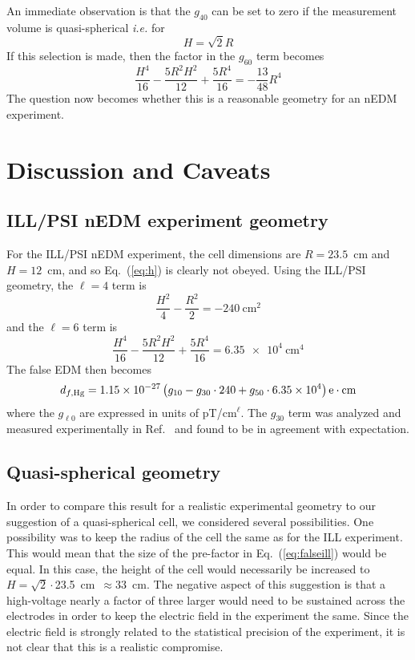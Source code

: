 \documentclass[preprint,12pt]{elsarticle}
\begin{document}
An immediate observation is that the $g_{40}$ can be set to zero if
the measurement volume is quasi-spherical {\it i.e.} for
\begin{equation}
\label{eq:h}
H=\sqrt{2}R
\end{equation}
If this selection is made, then the factor in the $g_{60}$ term becomes
\begin{equation}
\frac{H^{4}}{16}-\frac{5R^2H^2}{12}+\frac{5R^4}{16}=-\frac{13}{48}R^4
\end{equation}
The question now becomes whether this is a reasonable geometry for an
nEDM experiment.

\section{Discussion and Caveats}

\subsection{ILL/PSI nEDM experiment geometry}

For the ILL/PSI nEDM experiment, the cell dimensions are $R=23.5$~cm
and $H=12$~cm, and so Eq.~(\ref{eq:h}) is clearly not obeyed.  Using
the ILL/PSI geometry, the $\ell=4$ term is
\begin{equation}
\frac{H^{2}}{4}-\frac{R^2}{2}=-240~\mathrm{cm}^2
\end{equation}
and the $\ell=6$ term is
\begin{equation}
\frac{H^{4}}{16}-\frac{5R^2H^2}{12}+\frac{5R^4}{16}=\num{6.35e4}~\mathrm{cm}^4
\end{equation}
The false EDM then becomes
\begin{equation}
\label{eq:falseill}
d_{f,\rm Hg} = \num{1.15e-27}\left(g_{10} - g_{30}\cdot240 +
g_{50}\cdot\num{6.35e4}\right)\mathrm{e}\cdot\mathrm{cm}
\end{equation}
where the $g_{\ell0}$ are expressed in units of pT/cm$^\ell$.  The
$g_{30}$ term was analyzed and measured experimentally in
Ref.~\cite{bib:komposch} and found to be in agreement with
expectation.

\subsection{Quasi-spherical geometry}

In order to compare this result for a realistic experimental geometry
to our suggestion of a quasi-spherical cell, we considered several
possibilities.  One possibility was to keep the radius of the cell the
same as for the ILL experiment.  This would mean that the size of the
pre-factor in Eq.~(\ref{eq:falseill}) would be equal.  In this case,
the height of the cell would necessarily be increased to
$H=\sqrt{2}\cdot$23.5~cm~$\approx 33$~cm.  The negative aspect of this
suggestion is that a high-voltage nearly a factor of three larger
would need to be sustained across the electrodes in order to keep the
electric field in the experiment the same.  Since the electric field
is strongly related to the statistical precision of the experiment, it
is not clear that this is a realistic compromise.
\end{document}
